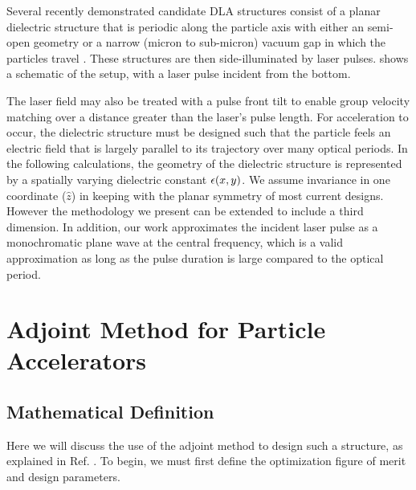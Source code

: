 Several recently demonstrated candidate DLA structures consist of a planar dielectric structure that is periodic along the particle axis with either an semi-open geometry or a narrow (micron to sub-micron) vacuum gap in which the particles travel \cite{plettner2006proposed, peralta2013demonstration, mcneur2016elements, leedle2015dielectric, chang2014silicon, breuer2014dielectric, breuer2014dielectric2, kozak2016dielectric}.
These structures are then side-illuminated by laser pulses.
 shows a schematic of the setup, with a laser pulse incident from the bottom.


The laser field may also be treated with a pulse front tilt \cite{hebling1996derivation, akturk2004pulse} to enable group velocity matching over a distance greater than the laser's pulse length.
For acceleration to occur, the dielectric structure must be designed such that the particle feels an electric field that is largely parallel to its trajectory over many optical periods.
In the following calculations, the geometry of the dielectric structure is represented by a spatially varying dielectric constant $\epsilon(x,y)$.
We assume invariance in one coordinate ($\hat{z}$) in keeping with the planar symmetry of most current designs.
However the methodology we present can be extended to include a third dimension.
In addition, our work approximates the incident laser pulse as a monochromatic plane wave at the central frequency, which is a valid approximation as long as the pulse duration is large compared to the optical period.

\section{Adjoint Method for Particle Accelerators}


\subsection{Mathematical Definition}

Here we will discuss the use of the adjoint method to design such a structure, as explained in Ref. .
To begin, we must first define the optimization figure of merit and design parameters.

